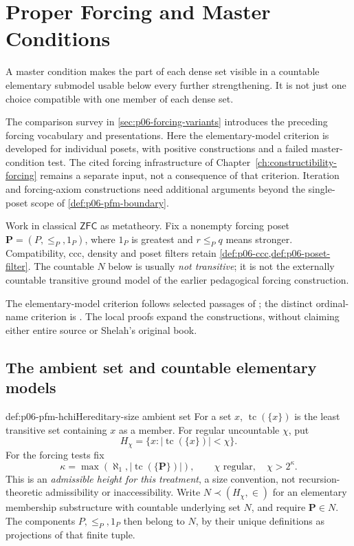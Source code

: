 \chapter{Proper Forcing and Master Conditions}
\label{sec:p06-proper-forcing-master}

A master condition makes the part of each dense set visible in a countable
elementary submodel usable below every further strengthening. It is not just
one choice compatible with one member of each dense set.

The comparison survey in \cref{sec:p06-forcing-variants} introduces the
preceding forcing vocabulary and presentations. Here the elementary-model
criterion is developed for individual posets, with positive constructions and
a failed master-condition test. The cited forcing infrastructure of
Chapter~\ref{ch:constructibility-forcing} remains a separate input, not a
consequence of that criterion. Iteration and forcing-axiom constructions need
additional arguments beyond the single-poset scope of
\cref{def:p06-pfm-boundary}.

Work in classical \(\mathsf{ZFC}\) as metatheory. Fix a nonempty forcing
poset \(\mathbf P=(P,\leq_P,1_P)\), where \(1_P\) is greatest and
\(r\leq_P q\) means stronger. Compatibility, ccc, density and poset filters
retain \cref{def:p06-ccc,def:p06-poset-filter}. The countable \(N\) below
is usually \emph{not transitive}; it is not the externally countable
transitive ground model of the earlier pedagogical forcing construction.

The elementary-model criterion follows selected passages of
\cite[pp.~19--23,48--49]{Dow1988ElementarySubmodels}; the distinct
ordinal-name criterion is
\cite[Definition~6.6, pp.~44--45]{VialeAudritoSteila2014SemiproperV1}.
The local proofs expand the constructions, without claiming either entire
source or Shelah's original book.

\section{The ambient set and countable elementary models}
\label{sec:p06-pfm-models}

\begin{hbdefinition}{def:p06-pfm-hchi}{Hereditary-size ambient set}
For a set \(x\), \(\operatorname{tc}(\{x\})\) is the least transitive set
containing \(x\) as a member. For regular uncountable \(\chi\), put
\[
 H_\chi=\{x:|\operatorname{tc}(\{x\})|<\chi\}.
\]
For the forcing tests fix
\[
 \kappa=\max(\aleph_1,|\operatorname{tc}(\{\mathbf P\})|),
 \qquad \chi\text{ regular},\quad\chi>2^\kappa.
\]
This is an \emph{admissible height for this treatment}, a size convention,
not recursion-theoretic admissibility or inaccessibility.
Write \(N\prec(H_\chi,\in)\) for an elementary membership substructure
with countable underlying set \(N\), and require \(\mathbf P\in N\).
The components \(P,\leq_P,1_P\) then belong to \(N\), by their unique
definitions as projections of that finite tuple.
\end{hbdefinition}

